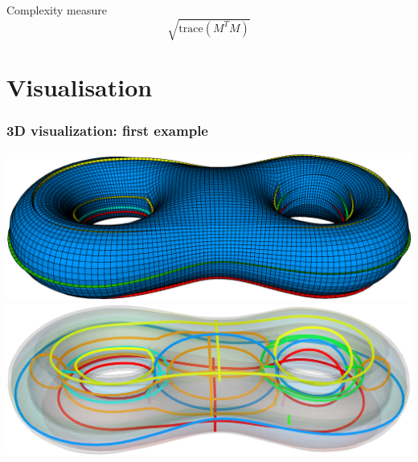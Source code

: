 \documentclass[12pt]{beamer}
\begin{document}
\begin{frame}
\begin{columns}
\begin{column}{0.5\textwidth}
    \end{column}
  \end{columns}
  \begin{block}{Complexity measure}\begin{equation*}
      \sqrt{\text{trace}(M^TM)}
  \end{equation*}\end{block}
\end{frame}

\section{Visualisation}


\begin{frame}[fragile]
  \frametitle{3D visualization: first example}
  \includegraphics[height=0.5\textheight]{./images/vis-3d-ex1-sheets.png}
  \includegraphics[height=0.5\textheight]{./images/vis-3d-ex1-curves.png}
\end{frame}
\end{document}

